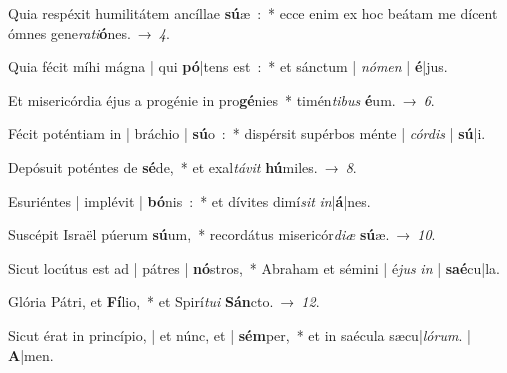 ﻿\item Quia respéxit humilitátem ancíllae \textbf{sú}\-æ~:~*
ecce enim ex hoc beátam me dícent ómnes gene\emph{ra}\-\emph{ti}\-\textbf{ó}\-nes.~→~\emph{4}.
\item Quia fécit míhi mágna | qui \textbf{pó}|tens est~:~*
et sánctum | \emph{nó}\-\emph{men} | \textbf{é}|jus.
\item Et misericórdia éjus a progénie in pro\textbf{gé}\-nies~*
timén\emph{ti}\-\emph{bus} \textbf{é}\-um.~→~\emph{6}.
\item Fécit poténtiam in | bráchio | \textbf{sú}\-o~:~*
dispérsit supérbos ménte | \emph{cór}\-\emph{dis} | \textbf{sú}|i.
\item Depósuit poténtes de \textbf{sé}\-de,~*
et exal\emph{tá}\-\emph{vit} \textbf{hú}\-miles.~→~\emph{8}.
\item Esuriéntes | implévit | \textbf{bó}\-nis~:~*
et dívites dimí\emph{sit} \emph{in}|\textbf{á}|nes.
\item Suscépit Israël púerum \textbf{sú}\-um,~*
recordátus misericór\emph{di}\-\emph{æ} \textbf{sú}\-æ.~→~\emph{10}.
\item Sicut locútus est ad | pátres | \textbf{nó}\-stros,~*
Abraham et sémini | é\emph{jus} \emph{in} | \textbf{saé}\-cu|la.
\item Glória Pátri, et \textbf{Fí}\-lio,~*
et Spirí\emph{tu}\-\emph{i} \textbf{Sán}\-cto.~→~\emph{12}.
\item Sicut érat in princípio, | et núnc, et | \textbf{sém}\-per,~*
et in saécula sæcu|\emph{ló}\-\emph{rum}. | \textbf{A}|men.
